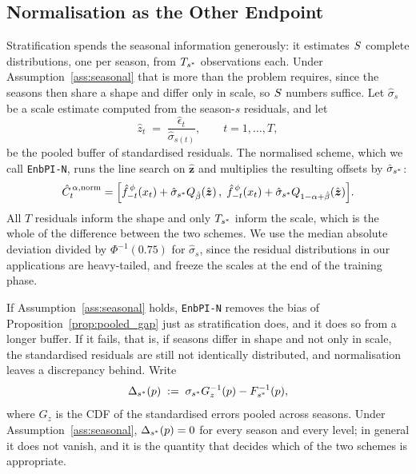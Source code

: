 \subsection{Normalisation as the Other Endpoint}
\label{sec:algorithm:normalised}

Stratification spends the seasonal information generously: it estimates
$S$ complete distributions, one per season, from $T_{s^*}$ observations
each.  Under Assumption~\ref{ass:seasonal} that is more than the problem
requires, since the seasons then share a shape and differ only in scale,
so $S$ numbers suffice.  Let $\hat{\sigma}_s$ be a scale estimate
computed from the season-$s$ residuals, and let
\begin{equation}
  \label{eq:normalised_buffer}
  \hat{z}_t \;=\; \frac{\hat{\epsilon}_t}{\hat{\sigma}_{s(t)}},
  \qquad t = 1,\ldots,T,
\end{equation}
be the pooled buffer of standardised residuals.  The normalised scheme,
which we call \texttt{EnbPI-N}, runs the line search on
$\hat{\boldsymbol z}$ and multiplies the resulting offsets by
$\hat{\sigma}_{s^*}$:
\begin{equation}
  \label{eq:enbpin_interval}
  \hat{C}_t^{\,\alpha,\textup{norm}}
  =
  \Bigl[
    \hat{f}_{-t}^{\,\phi}(x_t)
    + \hat{\sigma}_{s^*}Q_{\hat{\beta}}\!\left(\hat{\boldsymbol z}\right),\;
    \hat{f}_{-t}^{\,\phi}(x_t)
    + \hat{\sigma}_{s^*}Q_{1-\alpha+\hat{\beta}}\!\left(\hat{\boldsymbol z}\right)
  \Bigr].
\end{equation}
All $T$ residuals inform the shape and only $T_{s^*}$ inform the scale, which
is the whole of the difference between the two schemes.  We use the median
absolute deviation divided by $\Phi^{-1}(0.75)$ for
$\hat{\sigma}_s$, since the residual distributions in our applications are
heavy-tailed, and freeze the scales at the end of the training phase.

If Assumption~\ref{ass:seasonal} holds, \texttt{EnbPI-N} removes the bias
of Proposition~\ref{prop:pooled_gap} just as stratification does, and it
does so from a longer buffer.  If it fails, that is, if seasons differ in
shape and not only in scale, the standardised residuals are still not
identically distributed, and normalisation leaves a discrepancy behind.
Write
\begin{equation}
  \label{eq:shape_discrepancy}
  \Delta_{s^*}(p)
  \;:=\;
  \sigma_{s^*}G_z^{-1}(p) - F_{s^*}^{-1}(p),
\end{equation}
where $G_z$ is the CDF of the standardised errors pooled across seasons.
Under Assumption~\ref{ass:seasonal}, $\Delta_{s^*}(p) = 0$ for every
season and every level; in general it does not vanish, and it is the
quantity that decides which of the two schemes is appropriate.

